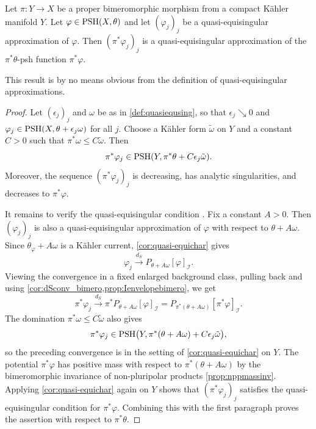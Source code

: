 \begin{corollary}\label{cor:quasi_equising_bimero}
    Let $\pi\colon Y\rightarrow X$ be a proper bimeromorphic morphism from a compact K\"ahler manifold $Y$. Let $\varphi\in \mathrm{PSH}(X,\theta)$ and let $(\varphi_j)_j$ be a quasi-equisingular approximation of $\varphi$. Then $(\pi^*\varphi_j)_j$ is a quasi-equisingular approximation of the $\pi^*\theta$-psh function $\pi^*\varphi$.
\end{corollary}
This result is by no means obvious from the definition of quasi-equisingular approximations.
\begin{proof}
    Let $(\epsilon_j)_j$ and $\omega$ be as in \cref{def:quasiequsing}, so that $\epsilon_j\searrow 0$ and $\varphi_j\in\mathrm{PSH}(X,\theta+\epsilon_j\omega)$ for all $j$. Choose a K\"ahler form $\tilde\omega$ on $Y$ and a constant $C>0$ such that $\pi^*\omega\leq C\tilde\omega$. Then
    \[
        \pi^*\varphi_j\in \mathrm{PSH}(Y,\pi^*\theta+C\epsilon_j\tilde\omega).
    \]
    Moreover, the sequence $(\pi^*\varphi_j)_j$ is decreasing, has analytic singularities, and decreases to $\pi^*\varphi$.

    It remains to verify the quasi-equisingular condition . Fix a constant $A>0$. Then $(\varphi_j)_j$ is also a quasi-equisingular approximation of $\varphi$ with respect to $\theta+A\omega$. Since $\theta_{\varphi}+A\omega$ is a K\"ahler current, \cref{cor:quasi-equichar} gives
    \[
        \varphi_j\xrightarrow{d_S}P_{\theta+A\omega}[\varphi]_{\mathcal I}.
    \]
    Viewing the convergence in a fixed enlarged background class, pulling back and using \cref{cor:dSconv_bimero,prop:Ienvelopebimero}, we get
    \[
        \pi^*\varphi_j\xrightarrow{d_S}\pi^*P_{\theta+A\omega}[\varphi]_{\mathcal I}
        =P_{\pi^*(\theta+A\omega)}[\pi^*\varphi]_{\mathcal I}.
    \]
    The domination $\pi^*\omega\leq C\tilde\omega$ also gives
    \[
        \pi^*\varphi_j\in \mathrm{PSH}\bigl(Y,\pi^*(\theta+A\omega)+C\epsilon_j\tilde\omega\bigr),
    \]
    so the preceding convergence is in the setting of \cref{cor:quasi-equichar} on $Y$. The potential $\pi^*\varphi$ has positive mass with respect to $\pi^*(\theta+A\omega)$ by the bimeromorphic invariance of non-pluripolar products \cref{prop:nppmassinv}. Applying \cref{cor:quasi-equichar} again on $Y$ shows that $(\pi^*\varphi_j)_j$ satisfies the quasi-equisingular condition  for $\pi^*\varphi$. Combining this with the first paragraph proves the assertion with respect to $\pi^*\theta$.
\end{proof}





